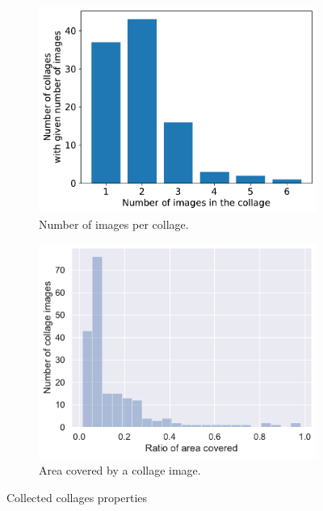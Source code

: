 \begin{figure}
     \centering
     \begin{subfigure}[b]{0.48\textwidth}
         \centering
         \includegraphics[width=\textwidth]{graphs/num_queries_in_request.pdf}
         \caption{Number of images per collage.}
     \end{subfigure}
     \hfill
     \begin{subfigure}[b]{0.48\textwidth}
         \centering
         \includegraphics[width=\textwidth]{graphs/queries_size.pdf}
         \caption{Area covered by a collage image.}
     \end{subfigure}
    
    \caption{Collected collages properties}
    \label{fig:annotated_dataset}
\end{figure}

